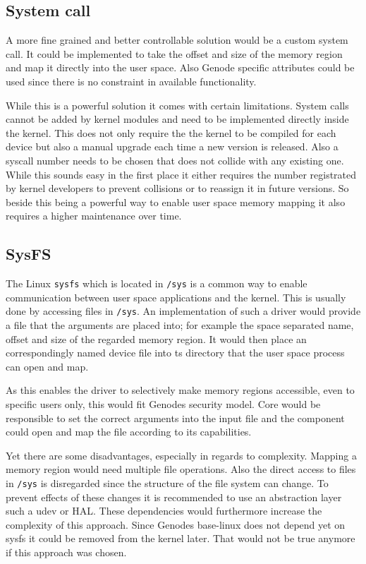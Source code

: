 \documentclass[
a4paper,
12pt,
notitlepage,
parskip=half,
DIV=11,
]{scrbook}
\begin{document}
		\subsection{System call}
		
		A more fine grained and better controllable solution would be a custom system call.
		It could be implemented to take the offset and size of the memory region and map it directly into the user space.
		Also Genode specific attributes could be used since there is no constraint in available functionality.
		
		While this is a powerful solution it comes with certain limitations.
		System calls cannot be added by kernel modules and need to be implemented directly inside the kernel.
		This does not only require the the kernel to be compiled for each device but also a manual upgrade each time a new version is released.
		Also a syscall number needs to be chosen that does not collide with any existing one.
		While this sounds easy in the first place it either requires the number registrated by kernel developers to prevent collisions or to reassign it in future versions.
		So beside this being a powerful way to enable user space memory mapping it also requires a higher maintenance over time. \citep{syscall}
		
		\subsection{SysFS}
		
		The Linux \texttt{sysfs} which is located in \texttt{/sys} is a common way to enable communication between user space applications and the kernel.
		This is usually done by accessing files in \texttt{/sys}.
		An implementation of such a driver would provide a file that the arguments are placed into; for example the space separated name, offset and size of the regarded memory region.
		It would then place an correspondingly named device file into ts directory that the user space process can open and map. \citep{sysfs}
		
		As this enables the driver to selectively make memory regions accessible, even to specific users only, this would fit Genodes security model.
		Core would be responsible to set the correct arguments into the input file and the component could open and map the file according to its capabilities.
		
		Yet there are some disadvantages, especially in regards to complexity.
		Mapping a memory region would need multiple file operations.
		Also the direct access to files in \texttt{/sys} is disregarded since the structure of the file system can change.
		To prevent effects of these changes it is recommended to use an abstraction layer such a udev or HAL.
		These dependencies would furthermore increase the complexity of this approach.
		Since Genodes base-linux does not depend yet on sysfs it could be removed from the kernel later.
		That would not be true anymore if this approach was chosen. \citep{sysfs}
		
\end{document}
